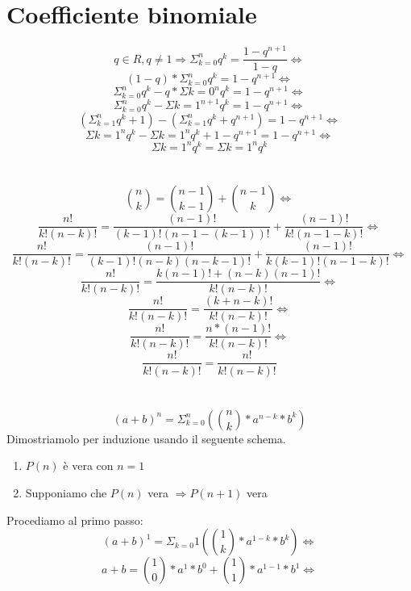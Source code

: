 \section{Coefficiente binomiale}
    $$q \in R, q \neq 1 \Longrightarrow \Sigma_{k=0}^{n}q^k = \frac{1-q^{n+1}}{1-q} \Longleftrightarrow$$
    $$(1-q) * \Sigma_{k=0}^{n}q^k = 1-q^{n+1} \Longleftrightarrow$$
    $$\Sigma_{k=0}^{n}q^k - q * \Sigma{k=0}^{n}q^k = 1-q^{n+1} \Longleftrightarrow$$
    $$\Sigma_{k=0}^{n}q^k - \Sigma{k=1}^{n+1}q^k = 1 - q^{n+1} \Longleftrightarrow$$
    $$\left(\Sigma_{k=1}^{n}q^k + 1\right) - \left(\Sigma_{k=1}^{n}q^k + q^{n+1}\right) = 1 - q^{n+1} \Longleftrightarrow$$
    $$\Sigma{k=1}^{n}q^k - \Sigma{k=1}^{n}q^k + 1 - q^{n+1} = 1 - q^{n+1} \Longleftrightarrow$$
    $$\Sigma{k=1}^{n}q^k = \Sigma{k=1}^{n}q^k$$ 
    \\ \\
    $$\binom{n}{k} = \binom{n-1}{k-1} + \binom{n-1}{k} \Longleftrightarrow$$
    $$\frac{n!}{k!\left(n-k\right)!} = 
        \frac{\left(n-1\right)!}{\left(k-1\right)!\left(n-1-\left(k-1\right)\right)!} + \frac{\left(n-1\right)!}{k!\left(n-1-k\right)!} \Longleftrightarrow$$
    $$\frac{n!}{k!\left(n-k\right)!} = 
        \frac{\left(n-1\right)!}{\left(k-1\right)!\left(n-k\right)\left(n-k-1\right)!} + \frac{\left(n-1\right)!}{k\left(k-1\right)!\left(n-1-k\right)!} \Longleftrightarrow$$
    $$\frac{n!}{k!\left(n-k\right)!} = 
        \frac{k\left(n-1\right)! + \left(n-k\right)\left(n-1\right)!}{k!\left(n-k\right)!} \Longleftrightarrow$$
    $$\frac{n!}{k!\left(n-k\right)!} = 
        \frac{\left(k+n-k\right)!}{k!\left(n-k\right)!} \Longleftrightarrow$$
    $$\frac{n!}{k!\left(n-k\right)!} = \frac{n * \left(n-1\right)!}{k!\left(n-k\right)!} \Longleftrightarrow$$
    $$\frac{n!}{k!\left(n-k\right)!} = \frac{n!}{k!\left(n-k\right)!}$$
    \\ \\
    $$\left(a+b\right)^n = \Sigma_{k=0}^{n}\left(\binom{n}{k} * a^{n-k} * b^k\right)$$
    Dimostriamolo per induzione usando il seguente schema.
    \begin{enumerate}
        \item $P\left(n\right)$ è vera con $n=1$
        \item Supponiamo che $P\left(n\right)$ vera $\Longrightarrow P\left(n+1\right)$ vera
    \end{enumerate}
    Procediamo al primo passo:
    $$\left(a+b\right)^1 = \Sigma_{k=0}{1}\left(\binom{1}{k} * a^{1-k} * b^k\right) \Longleftrightarrow$$
    $$a+b = \binom{1}{0} * a^1 * b^0 + \binom{1}{1} * a^{1-1} * b^1 \Longleftrightarrow$$
